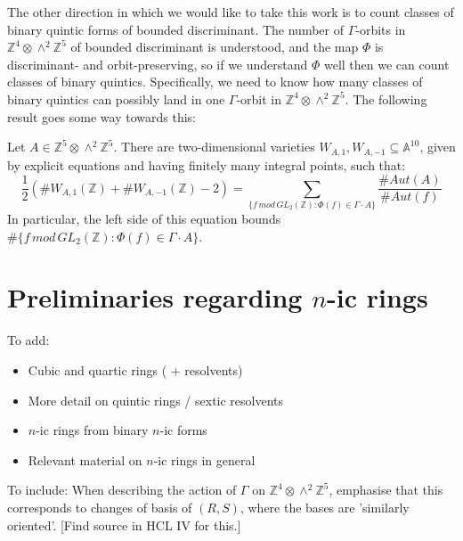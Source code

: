 \documentclass{report}
\begin{document}
The other direction in which we would like to take this work is to count classes of binary quintic forms of bounded discriminant.  The number of $\Gamma$-orbits in $\mathbb{Z}^4 \otimes \wedge^2 \mathbb{Z}^5$ of bounded discriminant is understood, and the map $\Phi$ is discriminant- and orbit-preserving, so if we understand $\Phi$ well then we can count classes of binary quintics.  Specifically, we need to know how many classes of binary quintics can possibly land in one $\Gamma$-orbit in $\mathbb{Z}^4 \otimes \wedge^2 \mathbb{Z}^5$.  The following result goes some way towards this:

\begin{theorem}
Let $A \in \mathbb{Z}^5 \otimes \wedge^2 \mathbb{Z}^5$.  There are two-dimensional varieties $W_{A,1}, W_{A,-1} \subseteq \mathbb{A}^{10}$, given by explicit equations and having finitely many integral points, such that:
\begin{equation}
\frac{1}{2}(\# W_{A,1}(\mathbb{Z}) + \# W_{A,-1}(\mathbb{Z}) - 2) = \sum_{\{f \, mod \, GL_2(\mathbb{Z}) : \Phi(f) \in \Gamma \cdot A \} } \frac{\#Aut(A)}{\#Aut(f)}
\end{equation}
In particular, the left side of this equation bounds $\# \{ f \, mod \, GL_2(\mathbb{Z}) : \Phi(f) \in \Gamma \cdot A \}$.
\end{theorem}

\chapter{Preliminaries regarding $n$-ic rings}

To add:
\begin{itemize}
\item Cubic and quartic rings ( + resolvents)
\item More detail on quintic rings / sextic resolvents
\item $n$-ic rings from binary $n$-ic forms
\item Relevant material on $n$-ic rings in general
\end{itemize}

To include: When describing the action of $\Gamma$ on $\mathbb{Z}^4 \otimes \wedge^2 \mathbb{Z}^5$, emphasise that this corresponds to changes of basis of $(R,S)$, where the bases are 'similarly oriented'.  [Find source in HCL IV for this.]
\end{document}
